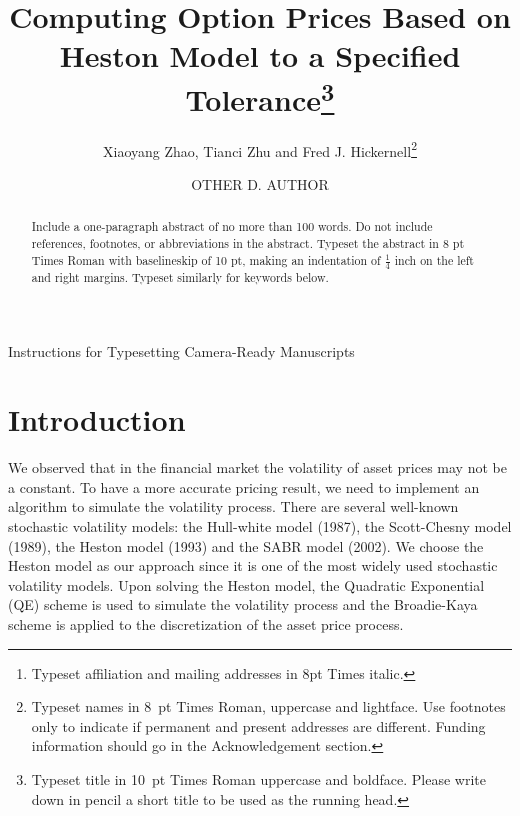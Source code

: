 \documentclass{ws-ijfe}
\begin{document}
{Instructions for Typesetting Camera-Ready Manuscripts}

\catchline{}{}{}{}{}

\title{Computing Option Prices Based on Heston Model to a Specified Tolerance\footnote{Typeset title in
10~pt Times Roman uppercase and boldface. Please write
down in pencil a short title to be used as the running head.}}

\author{Xiaoyang Zhao, Tianci Zhu and Fred J. Hickernell\footnote{Typeset names in 8~pt Times Roman, uppercase and lightface.  Use footnotes only to indicate if permanent and present addresses are different. Funding information should go in the Acknowledgement section.}}

\address{Full affiliations\footnote{Typeset
affiliation and mailing addresses in 8pt Times italic.} \\
,mailing addresses and telephone number}

\author{OTHER D. AUTHOR}

\address{Full affiliations \\
,mailing addresses and telephone number}

\maketitle

\begin{abstract}
Include a one-paragraph abstract of no more than 100 words. Do not include references, footnotes, or abbreviations in the abstract. Typeset the
abstract in 8 pt Times Roman with baselineskip of 10 pt, making
an indentation of $\frac14$ inch on the left and right margins.
Typeset similarly for keywords below.
\end{abstract}


\section{Introduction}

We observed that in the financial market the volatility of asset prices may not be a constant. To have a more accurate pricing result, we need to implement an algorithm to simulate the volatility process. There are several well-known stochastic volatility models: the Hull-white model (1987), the Scott-Chesny model (1989), the Heston model (1993) and the SABR model (2002). We choose the Heston model as our approach since it is one of the most widely used stochastic volatility models. Upon solving the Heston model, the Quadratic Exponential (QE) scheme is used to simulate the volatility process and the Broadie-Kaya scheme is applied to the discretization of the asset price process.
\end{document}
